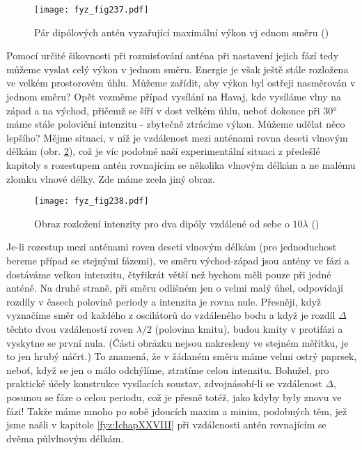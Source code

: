     \begin{figure}[ht!] %
      \centering
      \texttt{[image: fyz\_fig237.pdf]}
      \caption{Pár dipólových antén vyzařující maximální výkon vj ednom směru
               (\cite[s.~384]{Feynman01})}
      \label{fyz:fig237}
    \end{figure}
    
    Pomocí určité šikovnosti při rozmisťování anténa při nastavení jejich fází tedy můžeme vyslat 
    celý výkon v jednom směru. Energie je však ještě stále rozložena ve velkém prostorovém úhlu. 
    Můžeme zařídit, aby výkon byl ostřeji nasměrován v jednom směru? Opět vezměme případ vysílání 
    na Havaj, kde vysíláme vlny na západ a na východ, přičemž se šíří v dost velkém úhlu, neboť 
    dokonce při \ang{30} máme stále poloviční intenzitu - zbytečně ztrácíme výkon. Můžeme udělat 
    něco lepšího? Mějme situaci, v níž je vzdálenost mezi anténami rovna deseti vlnovým délkám 
    (obr. \ref{fyz:fig238}), což je víc podobné naší experimentální situaci z předešlé kapitoly s 
    rozestupem antén rovnajícím se několika vlnovým délkám a ne malému zlomku vlnové délky. Zde 
    máme zcela jiný obraz.
    
    \begin{figure}[ht!] %
      \centering
      \texttt{[image: fyz\_fig238.pdf]}
      \caption{ Obraz rozložení intenzity pro dva dipóly vzdálené od sebe o \(10\lambda\)
               (\cite[s.~385]{Feynman01})}
      \label{fyz:fig238}
    \end{figure}
    
    Je-li rozestup mezi anténami roven deseti vlnovým délkám (pro jednoduchost bereme případ se 
    stejnými fázemi), ve směru východ-západ jsou antény ve fázi a dostáváme velkou intenzitu, 
    čtyřikrát větší než bychom měli pouze při jedné anténě. Na druhé straně, při směru odlišném jen 
    o velmi malý úhel, odpovídají rozdíly v časech polovině periody a intenzita je rovna nule. 
    Přesněji, když vyznačíme směr od každého z oscilátorů do vzdáleného bodu a když je rozdíl 
    \(\Delta\) těchto dvou vzdáleností roven \(\lambda/2\) (polovina kmitu), budou kmity v 
    protifázi a vyskytne se první nula. (Části obrázku nejsou nakresleny ve stejném měřítku, je to 
    jen hrubý náčrt.) To znamená, že v žádaném směru máme velmi ostrý paprsek, neboť, když se jen o 
    málo odchýlíme, ztratíme celou intenzitu. Bohužel, pro praktické účely konstrukce vysílacích 
    soustav, zdvojnásobí-li se vzdálenost \(\Delta\), posunou se fáze o celou periodu, což je 
    přesně totéž, jako kdyby byly znovu ve fázi! Takže máme mnoho po sobě jdoucích maxim a minim, 
    podobných těm, jež jsme našli v kapitole \ref{fyz:IchapXXVIII} při vzdálenosti antén rovnajícím 
    se dvěma půlvlnovým délkám.
    
